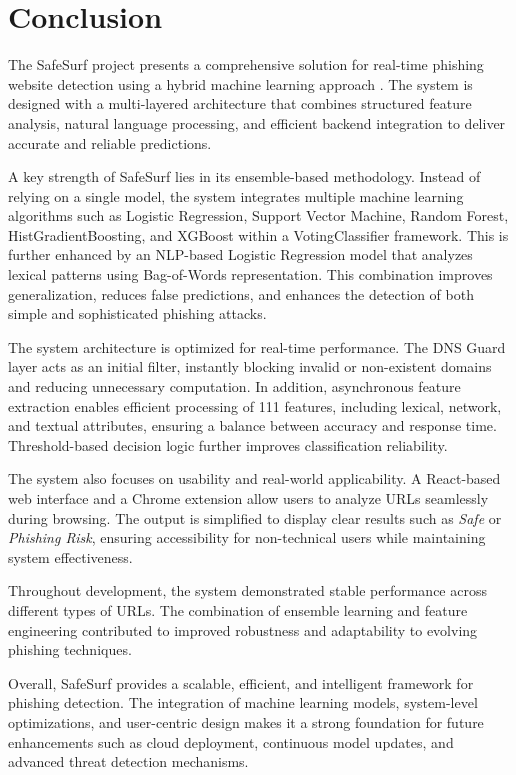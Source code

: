 \chapter{Conclusion}

The SafeSurf project presents a comprehensive solution for real-time phishing website detection using a hybrid machine learning approach \cite{ref1, ref5}. The system is designed with a multi-layered architecture that combines structured feature analysis, natural language processing, and efficient backend integration to deliver accurate and reliable predictions.

A key strength of SafeSurf lies in its ensemble-based methodology. Instead of relying on a single model, the system integrates multiple machine learning algorithms such as Logistic Regression, Support Vector Machine, Random Forest, HistGradientBoosting, and XGBoost within a VotingClassifier framework. This is further enhanced by an NLP-based Logistic Regression model that analyzes lexical patterns using Bag-of-Words representation. This combination improves generalization, reduces false predictions, and enhances the detection of both simple and sophisticated phishing attacks.

The system architecture is optimized for real-time performance. The DNS Guard layer acts as an initial filter, instantly blocking invalid or non-existent domains and reducing unnecessary computation. In addition, asynchronous feature extraction enables efficient processing of 111 features, including lexical, network, and textual attributes, ensuring a balance between accuracy and response time. Threshold-based decision logic further improves classification reliability.

The system also focuses on usability and real-world applicability. A React-based web interface and a Chrome extension allow users to analyze URLs seamlessly during browsing. The output is simplified to display clear results such as \textit{Safe} or \textit{Phishing Risk}, ensuring accessibility for non-technical users while maintaining system effectiveness.

Throughout development, the system demonstrated stable performance across different types of URLs. The combination of ensemble learning and feature engineering contributed to improved robustness and adaptability to evolving phishing techniques.

Overall, SafeSurf provides a scalable, efficient, and intelligent framework for phishing detection. The integration of machine learning models, system-level optimizations, and user-centric design makes it a strong foundation for future enhancements such as cloud deployment, continuous model updates, and advanced threat detection mechanisms.